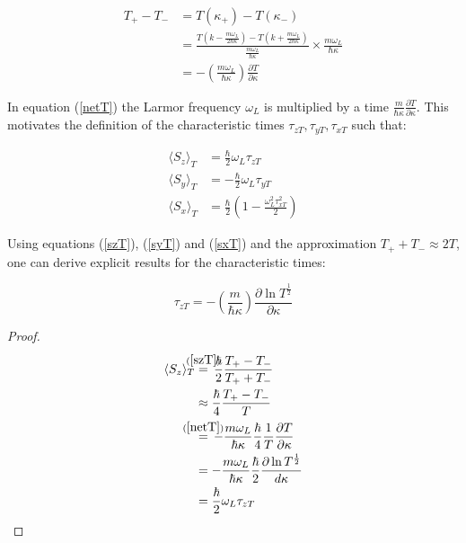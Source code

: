 \documentclass{article}
\begin{document}
\begin{align}
	T_+-T_- &= T(\kappa_+)-T(\kappa_-)\\
		&= \frac{T(k-\frac{m\omega_L}{2\hbar\kappa})-T(k+\frac{m\omega_L}{2\hbar\kappa})}{\frac{m\omega_L}{\hbar\kappa}}\times \frac{m\omega_L}{\hbar\kappa} \\
		&=-\left(\frac{m\omega_L}{\hbar\kappa}\right)\frac{\partial T}{\partial \kappa} \label{netT}
\end{align}

\noindent In equation (\ref{netT}) the Larmor frequency $\omega_L$ is multiplied by a time $\frac{m}{\hbar\kappa}\frac{\partial T}{\partial \kappa}$. This motivates the definition of the characteristic times $\tau_{zT}, \tau_{yT}, \tau_{xT}$ such that:

\begin{subequations}  \label{characteristictransmissiontimes}
	\begin{align}	\langle S_z \rangle_T &= \frac{\hbar}{2}\omega_L\tau_{zT} \\
		\langle S_y \rangle_T &= -\frac{\hbar}{2}\omega_L\tau_{yT} \\
		\langle S_x \rangle_T &= \frac{\hbar}{2}\left(1-\frac{\omega_L^2\tau_{xT}^2}{2}\right)
\end{align}
\end{subequations}

\noindent Using equations (\ref{szT}), (\ref{syT}) and (\ref{sxT}) and the approximation $T_++T_- \approx 2T$, one can derive explicit results for the characteristic times:

\begin{equation}
	\tau_{zT} = -\left(\frac{m}{\hbar\kappa}\right)\frac{\partial \ln{T^{\frac{1}{2}}}}{\partial\kappa} \label{tauz}
\end{equation}

\begin{proof}
\begin{align}
	\langle S_z \rangle_T &\stackrel{\mathclap{(\ref{szT})}}{=}\,\frac{\hbar}{2}\frac{T_+-T_-}{T_++T_-}\\
	&\approx \frac{\hbar}{4}\frac{T_+-T_-}{T}\\
	&\stackrel{\mathclap{(\ref{netT})}}{=}\,-\frac{m\omega_L}{\hbar\kappa}\frac{\hbar}{4}\frac{1}{T}\frac{\partial T}{\partial \kappa} \\
	&=-\frac{m\omega_L}{\hbar\kappa}\frac{\hbar}{2}\frac{\partial\ln{T^{\frac{1}{2}}}}{d\kappa} \\
	&=\frac{\hbar}{2}\omega_L\tau_{zT}
\end{align}
\end{proof}
\end{document}
